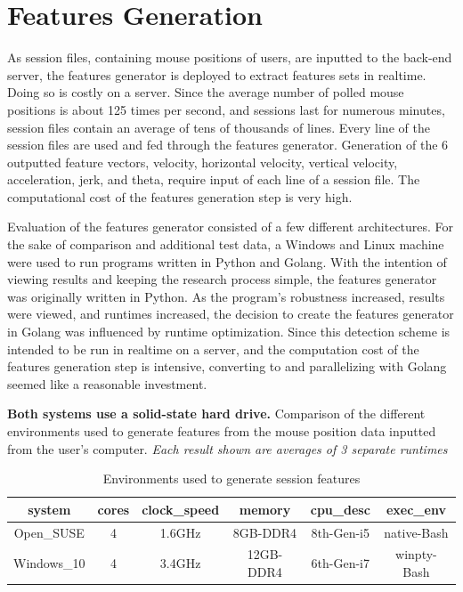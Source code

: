 
\section{Features Generation}\label{sec:evaluation-features-generation}
As session files, containing mouse positions of users, are inputted to the back-end server, the features generator is deployed to extract features sets in realtime. Doing so is costly on a server. Since the average number of polled mouse positions is about 125 times per second, and sessions last for numerous minutes, session files contain an average of tens of thousands of lines. Every line of the session files are used and fed through the features generator. Generation of the 6 outputted feature vectors, velocity, horizontal velocity, vertical velocity, acceleration, jerk, and theta, require input of each line of a session file. The computational cost of the features generation step is very high.

Evaluation of the features generator consisted of a few different architectures. For the sake of comparison and additional test data, a Windows and Linux machine were used to run programs written in Python and Golang. With the intention of viewing results and keeping the research process simple, the features generator was originally written in Python. As the program's robustness increased, results were viewed, and runtimes increased, the decision to create the features generator in Golang was influenced by runtime optimization. Since this detection scheme is intended to be run in realtime on a server, and the computation cost of the features generation step is intensive, converting to and parallelizing with Golang seemed like a reasonable investment.

\begin{table}[h!]
    \centering
    \caption{Environments used to generate session features}
    {\small \textbf{Both systems use a solid-state hard drive.} Comparison of the different environments used to generate features from the mouse position data inputted from the user's computer. \textit{Each result shown are averages of 3 separate runtimes}}
    \bigskip
	\label{tab:environments-used-to-generate-session-features}
    \begin{tabular}{ |c|c|c|c|c|c| }
        \hline
        \textbf{system} & \textbf{cores} & \textbf{clock{\_}speed} & \textbf{memory} & \textbf{cpu{\_}desc} & \textbf{exec{\_}env} \\
        \hline
        Open{\_}SUSE & 4 & 1.6GHz & 8GB-DDR4 & 8th-Gen-i5 & native-Bash \\
        Windows{\_}10 & 4 & 3.4GHz & 12GB-DDR4 & 6th-Gen-i7 & winpty-Bash \\
        \hline
    \end{tabular}
\end{table}

